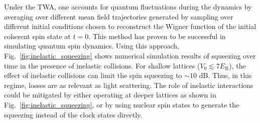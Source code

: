 \documentclass[aps,prx,superscriptaddress,notitlepage,twocolumn,longbibliography]{revtex4-2}
\renewcommand{\t}{\text} %
\begin{document}
Under the TWA, one accounts for quantum fluctuations during the dynamics by  averaging over different mean field trajectories generated by sampling over different initial conditions chosen to reconstruct the Wigner function of the initial coherent spin state at $t=0$\cite{rey2014probing}.
This method has proven to be successful in simulating quantum spin dynamics.
Using this approach, Fig.~\ref{fig:inelastic_squeezing} shows numerical simulation results of squeezing over time in the presence of inelastic collisions.
For shallow lattices ($V_0\lesssim7E_{\t{R}}$), the effect of inelastic collisions can limit the spin squeezing to $\sim10$ dB.
Thus, in this regime, losses are as relevant as light scattering.
The role of inelastic interactions could be mitigated by either operating at deeper lattices as shown in Fig.~\ref{fig:inelastic_squeezing}, or by using nuclear spin states to generate the squeezing instead of the clock states directly.



\end{document}
